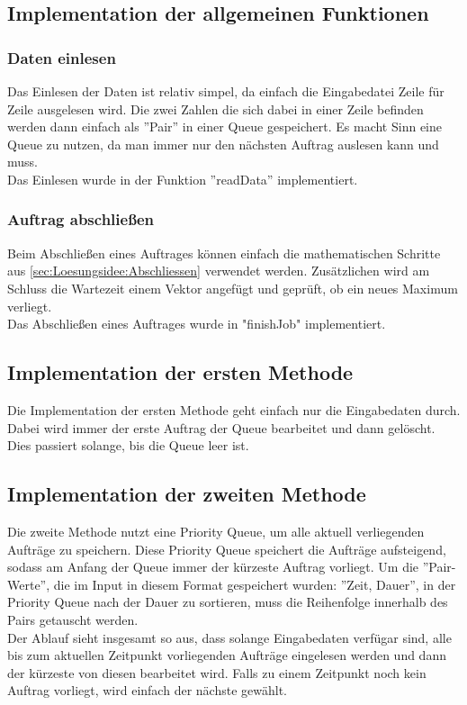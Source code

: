 \documentclass[a4paper,10pt,ngerman]{scrartcl}
\begin{document}
    \subsection{Implementation der allgemeinen Funktionen}
      \subsubsection{Daten einlesen}
        Das Einlesen der Daten ist relativ simpel, da einfach die Eingabedatei Zeile für Zeile ausgelesen wird. Die zwei Zahlen die sich dabei in einer Zeile befinden werden dann einfach als ''Pair'' in einer Queue gespeichert. Es macht Sinn eine Queue zu nutzen, da man immer nur den nächsten Auftrag auslesen kann und muss.\\
        Das Einlesen wurde in der Funktion ''readData'' implementiert.
      \subsubsection{Auftrag abschließen} 
        Beim Abschließen eines Auftrages können einfach die mathematischen Schritte aus \cref{sec:Loesungsidee:Abschliessen} verwendet werden. Zusätzlichen wird am Schluss die Wartezeit einem Vektor angefügt und geprüft, ob ein neues Maximum verliegt.\\
        Das Abschließen eines Auftrages wurde in "finishJob" implementiert.
    \subsection{Implementation der ersten Methode}
      Die Implementation der ersten Methode geht einfach nur die Eingabedaten durch. Dabei wird immer der erste Auftrag der Queue bearbeitet und dann gelöscht. Dies passiert solange, bis die Queue leer ist.
    \subsection{Implementation der zweiten Methode}
      Die zweite Methode nutzt eine Priority Queue, um alle aktuell verliegenden Aufträge zu speichern. Diese Priority Queue speichert die Aufträge aufsteigend, sodass am Anfang der Queue immer der kürzeste Auftrag vorliegt. Um die ''Pair-Werte'', die im Input in diesem Format gespeichert wurden: ''{Zeit, Dauer}'', in der Priority Queue nach der Dauer zu sortieren, muss die Reihenfolge innerhalb des Pairs getauscht werden.\\
      Der Ablauf sieht insgesamt so aus, dass solange Eingabedaten verfügar sind, alle bis zum aktuellen Zeitpunkt vorliegenden Aufträge eingelesen werden und dann der kürzeste von diesen bearbeitet wird. Falls zu einem Zeitpunkt noch kein Auftrag vorliegt, wird einfach der nächste gewählt. 
\end{document}
